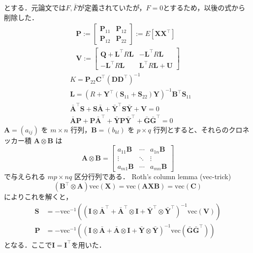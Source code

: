とする．元論文では$F, \bar{F}$が定義されていたが，$F=0$とするため，以後の式から削除した．
$$
\begin{array}{l}
\mathbf{P} :=\left[\begin{array}{cc}
\mathbf{P}_{11} & \mathbf{P}_{12} \\
\mathbf{P}_{12} & \mathbf{P}_{22}
\end{array}\right] := E\left[\mathbf{X} \mathbf{X}^\top\right] \\
\mathbf{V} :=\left[\begin{array}{cc}
\mathbf{Q}+\mathbf{L}^\top R \mathbf{L} & -\mathbf{L}^\top R \mathbf{L} \\
-\mathbf{L}^\top R \mathbf{L} & \mathbf{L}^\top R \mathbf{L}+\mathbf{U}
\end{array}\right]
\end{array}
$$
$$
\begin{align}
&K=\mathbf{P}_{22} \mathbf{C}^\top\left(\mathbf{D} \mathbf{D}^\top\right)^{-1} \\
&\mathbf{L}=\left(R+\mathbf{Y}^\top\left(\mathbf{S}_{11}+\mathbf{S}_{22}\right) \mathbf{Y}\right)^{-1} \mathbf{B}^\top \mathbf{S}_{11} \\
&\bar{\mathbf{A}}^\top \mathbf{S}+\mathbf{S} \bar{\mathbf{A}}+\bar{\mathbf{Y}}^\top \mathbf{S} \bar{\mathbf{Y}}+\mathbf{V}=0 \\
&\bar{\mathbf{A}} \mathbf{P}+\mathbf{P} \bar{\mathbf{A}}^\top+\bar{\mathbf{Y}} \mathbf{P} \bar{\mathbf{Y}}^\top+\bar{\mathbf{G}} \bar{\mathbf{G}}^\top=0
\end{align}
$$
$\mathbf{A} = (a_{ij})$ を $m \times n$ 行列，$\mathbf{B} = (b_{kl})$ を $p \times q$ 行列とすると、それらのクロネッカー積 $\mathbf{A} \otimes \mathbf{B}$ は
$$
\mathbf{A}\otimes \mathbf{B}={\begin{bmatrix}a_{11}\mathbf{B}&\cdots &a_{1n}\mathbf{B}\\\vdots &\ddots &\vdots \\a_{m1}\mathbf{B}&\cdots &a_{mn}\mathbf{B}\end{bmatrix}}
$$
で与えられる $mp \times nq$ 区分行列である．
Roth's column lemma (vec-trick) 
$$
(\mathbf{B}^\top \otimes \mathbf{A})\text{vec}(\mathbf{X}) = \text{vec}(\mathbf{A}\mathbf{X}\mathbf{B})=\text{vec}(\mathbf{C})
$$
によりこれを解くと，
$$
\begin{align}
\mathbf{S} &= -\text{vec}^{-1}\left(\left(\mathbf{I} \otimes \bar{\mathbf{A}}^\top + \bar{\mathbf{A}}^\top \otimes \mathbf{I} + \bar{\mathbf{Y}}^\top \otimes \bar{\mathbf{Y}}^\top\right)^{-1}\text{vec}(\mathbf{V})\right)\\
\mathbf{P} &= -\text{vec}^{-1}\left(\left(\mathbf{I} \otimes \bar{\mathbf{A}} + \bar{\mathbf{A}} \otimes \mathbf{I} + \bar{\mathbf{Y}} \otimes \bar{\mathbf{Y}}\right)^{-1}\text{vec}(\bar{\mathbf{G}}\bar{\mathbf{G}}^\top)\right)
\end{align}
$$
となる．ここで$\mathbf{I}=\mathbf{I}^\top$を用いた．